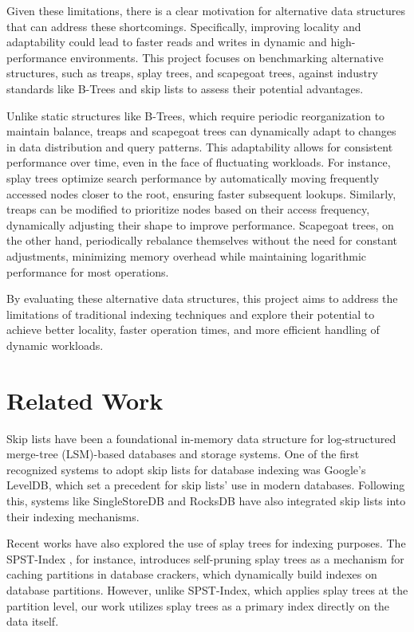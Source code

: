 \documentclass[sigconf]{acmart}
\begin{document}
Given these limitations, there is a clear motivation for alternative data structures that can address these shortcomings. Specifically, improving locality and adaptability could lead to faster reads and writes in dynamic and high-performance environments. This project focuses on benchmarking alternative structures, such as treaps, splay trees, and scapegoat trees, against industry standards like B-Trees and skip lists to assess their potential advantages.

Unlike static structures like B-Trees, which require periodic reorganization to maintain balance, treaps and scapegoat trees can dynamically adapt to changes in data distribution and query patterns. This adaptability allows for consistent performance over time, even in the face of fluctuating workloads. For instance, splay trees optimize search performance by automatically moving frequently accessed nodes closer to the root, ensuring faster subsequent lookups. Similarly, treaps can be modified to prioritize nodes based on their access frequency, dynamically adjusting their shape to improve performance. Scapegoat trees, on the other hand, periodically rebalance themselves without the need for constant adjustments, minimizing memory overhead while maintaining logarithmic performance for most operations.

By evaluating these alternative data structures, this project aims to address the limitations of traditional indexing techniques and explore their potential to achieve better locality, faster operation times, and more efficient handling of dynamic workloads.


\section{Related Work}
Skip lists have been a foundational in-memory data structure for log-structured merge-tree (LSM)-based databases and storage systems. One of the first recognized systems to adopt skip lists for database indexing was Google's LevelDB, which set a precedent for skip lists' use in modern databases. Following this, systems like SingleStoreDB \cite{prout_2019_the} and RocksDB have also integrated skip lists into their indexing mechanisms.

Recent works have also explored the use of splay trees for indexing purposes. The SPST-Index \cite{spst_index}, for instance, introduces self-pruning splay trees as a mechanism for caching partitions in database crackers, which dynamically build indexes on database partitions. However, unlike SPST-Index, which applies splay trees at the partition level, our work utilizes splay trees as a primary index directly on the data itself.
\end{document}
